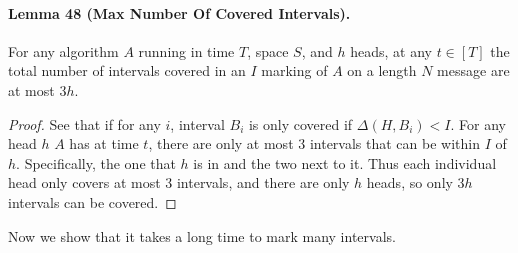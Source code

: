 \documentclass[10pt,a4paper]{article}
\begin{document}
\paragraph{Lemma 48 (Max Number Of Covered Intervals).} For any algorithm $A$ running in time $T$, space $S$, and $h$ heads, at any $t\in[T]$ the total number of intervals covered in an $I$ marking of $A$ on a length $N$ message are at most $3h$.
\begin{proof}
See that if for any $i$, interval $B_i$ is only covered if $\Delta(H,B_i)<I$. For any head $h$ $A$ has at time $t$, there are only at most 3 intervals that can be within $I$ of $h$. Specifically, the one that $h$ is in and the two next to it. Thus each individual head only covers at most 3 intervals, and there are only $h$ heads, so only $3h$ intervals can be covered.
\end{proof}
Now we show that it takes a long time to mark many intervals.
\end{document}
